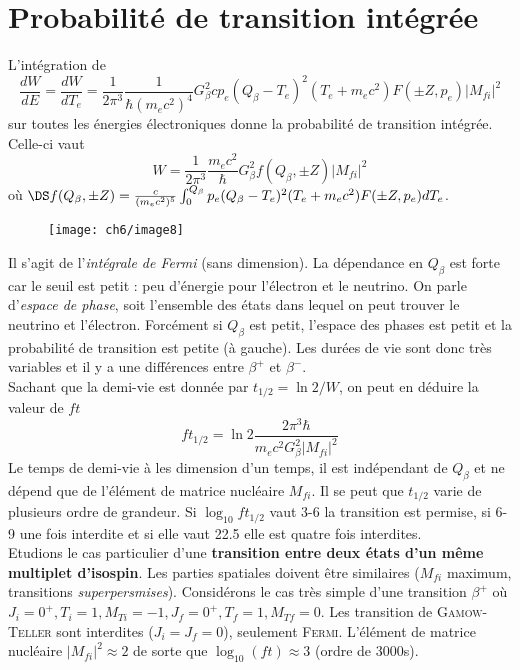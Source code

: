 \section{Probabilité de transition intégrée}
L'intégration de 
\begin{equation}
\frac{dW}{dE} = \dfrac{dW}{dT_e} = \frac{1}{2\pi^3}\frac{1}{\hbar(m_ec^2)^4}G_\beta^2cp_e(Q_\beta-T_e)^2(T_e+
m_ec^2)F(\pm Z,p_e)|M_{fi}|^2
\end{equation}
sur toutes les énergies électroniques donne la probabilité de transition intégrée. Celle-ci vaut
\begin{equation}
W = \frac{1}{2\pi^3}\frac{m_ec^2}{\hbar}G_\beta^2f(Q_{\beta},\pm Z)|M_{fi}|^2
\end{equation}
où $\DS f(Q_\beta, \pm Z) = \frac{c}{(m_ec^2)^5}\int_0^{Q_\beta} p_e(Q_\beta-T_e)^2(T_e+m_ec^2)F(\pm Z, p_e)dT_e$.\\


	\begin{wrapfigure}[9]{r}{6cm}
	\vspace{-8mm}
	\texttt{[image: ch6/image8]}
	\end{wrapfigure}
Il s'agit de l'\textit{intégrale de Fermi} (sans dimension). La dépendance en $Q_\beta$ est forte car le seuil 
est petit : peu d'énergie pour l'électron et le neutrino. On parle d'\textit{espace de phase}, soit l'ensemble des
états dans lequel on peut trouver le neutrino et l'électron. Forcément si $Q_\beta$ est petit, l'espace des phases
est petit et la probabilité de transition est petite (à gauche). Les durées de vie sont donc très variables et
il y a une différences entre $\beta^+$ et $\beta^-$.\\

Sachant que la demi-vie est donnée par $t_{1/2} = \ln 2/W$, on peut en déduire la valeur de $ft$
\begin{equation}
ft_{1/2} = \ln2\dfrac{2\pi^3\hbar}{m_ec^2G_\beta^2|M_{fi}|^2}
\end{equation}
Le temps de demi-vie à les dimension d'un temps, il est indépendant de $Q_\beta$ et ne dépend que de l'élément de
matrice nucléaire $M_{fi}$. Il se peut que $t_{1/2}$ varie de plusieurs ordre de grandeur. Si $\log_{10} ft_{1/2}$
vaut 3-6 la transition est permise, si 6-9 une fois interdite et si elle vaut 22.5 elle est quatre fois 
interdites.\\

Etudions le cas particulier d'une \textbf{transition entre deux états d'un même multiplet d'isospin}. Les parties
spatiales doivent être similaires ($M_{fi}$ maximum, transitions \textit{superpersmises}).  Considérons le 
cas très simple d'une transition $\beta^+$ où $J_i=0^+, T_i=1, M_{Ti}=-1, J_f=0^+, T_f=1,M_{Tf}=0$. Les 
transition de \textsc{Gamow-Teller} sont interdites ($J_i=J_f=0$), seulement \textsc{Fermi}. L'élément de matrice
nucléaire $|M_{fi}|^2\approx 2$ de sorte que $\log_10(ft)\approx 3$ (ordre de 3000s).


